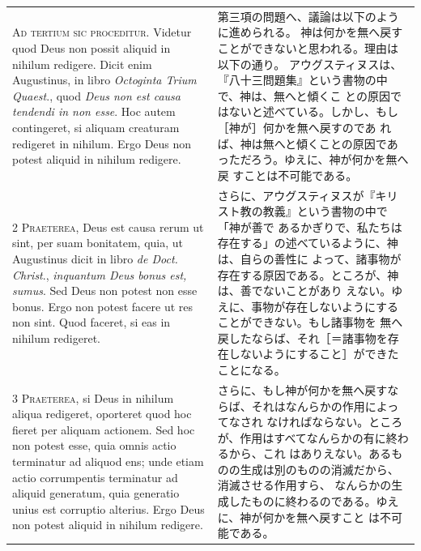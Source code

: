 \documentclass[paper=a4paper,fontsize=10pt,jafontsize=9pt,titlepage]{jlreq}
\begin{document}
\begin{longtable}{p{21em}p{21em}}

{\huge A}{\scshape d tertium sic proceditur}. Videtur quod Deus non
possit aliquid in nihilum redigere. Dicit enim Augustinus, in libro
{\itshape Octoginta Trium Quaest}., quod {\itshape Deus non est causa
tendendi in non esse}. Hoc autem contingeret, si aliquam creaturam
redigeret in nihilum. Ergo Deus non potest aliquid in nihilum redigere.


&


第三項の問題へ、議論は以下のように進められる。
神は何かを無へ戻すことができないと思われる。理由は以下の通り。
アウグスティヌスは、『八十三問題集』という書物の中で、神は、無へと傾くこ
 との原因ではないと述べている。しかし、もし［神が］何かを無へ戻すのであ
 れば、神は無へと傾くことの原因であっただろう。ゆえに、神が何かを無へ戻
 すことは不可能である。

\\


{\scshape 2 Praeterea}, Deus est causa rerum ut sint, per suam
bonitatem, quia, ut Augustinus dicit in libro {\itshape de
Doct. Christ}., {\itshape inquantum Deus bonus est, sumus}. Sed Deus non
potest non esse bonus. Ergo non potest facere ut res non sint. Quod
faceret, si eas in nihilum redigeret.

&
さらに、アウグスティヌスが『キリスト教の教義』という書物の中で「神が善で
 あるかぎりで、私たちは存在する」の述べているように、神は、自らの善性に
 よって、諸事物が存在する原因である。ところが、神は、善でないことがあり
 えない。ゆえに、事物が存在しないようにすることができない。もし諸事物を
 無へ戻したならば、それ［＝諸事物を存在しないようにすること］ができたことになる。

\\


{\scshape 3 Praeterea}, si Deus in nihilum aliqua
redigeret, oporteret quod hoc fieret per aliquam actionem. Sed hoc non
potest esse, quia omnis actio terminatur ad aliquod ens; unde etiam
actio corrumpentis terminatur ad aliquid generatum, quia generatio unius
est corruptio alterius. Ergo Deus non potest aliquid in nihilum
redigere.

&


さらに、もし神が何かを無へ戻すならば、それはなんらかの作用によってなされ
 なければならない。ところが、作用はすべてなんらかの有に終わるから、これ
 はありえない。あるものの生成は別のものの消滅だから、消滅させる作用すら、
 なんらかの生成したものに終わるのである。ゆえに、神が何かを無へ戻すこと
 は不可能である。


\end{longtable}
\end{document}
